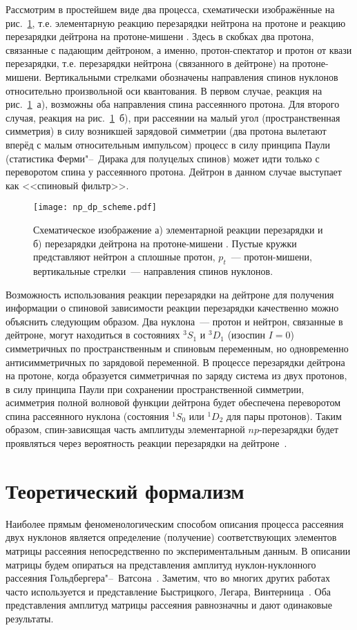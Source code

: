 Рассмотрим в простейшем виде два процесса, схематически изображённые на
рис.~\ref{fig:np_dp_scheme}, т.е. элементарную реакцию перезарядки нейтрона на
протоне \np и реакцию перезарядки дейтрона на протоне-мишени \dpchex. Здесь в
скобках два протона, связанные с падающим дейтроном, а именно,
протон-спектатор и протон от квази \np перезарядки, т.е. перезарядки
нейтрона (связанного в дейтроне) на протоне-мишени. Вертикальными стрелками
обозначены направления спинов нуклонов относительно произвольной оси
квантования. В первом случае, реакция \np на рис.~\ref{fig:np_dp_scheme}~а),
возможны оба направления спина рассеянного протона. Для второго случая, реакция
\dpchex на рис.~\ref{fig:np_dp_scheme}~б), при рассеянии на малый угол
(пространственная симметрия) в силу возникшей зарядовой симметрии (два протона
вылетают вперёд с малым относительным импульсом) процесс в силу принципа Паули
(статистика Ферми"--~Дирака для полуцелых спинов) может идти только с
переворотом спина у рассеянного протона. Дейтрон в данном случае выступает как
<<спиновый фильтр>>.

\begin{figure}[h]
  \centering
  \texttt{[image: np\_dp\_scheme.pdf]}
  \caption{Схематическое изображение а) элементарной реакции перезарядки \np
    и б) перезарядки дейтрона на протоне-мишени \dpchex. Пустые кружки
    представляют нейтрон а сплошные протон, $p_{t}$~--- протон-мишени,
    вертикальные стрелки~--- направления спинов нуклонов.}
  \label{fig:np_dp_scheme}
\end{figure}

Возможность использования реакции перезарядки на дейтроне для получения
информации о спиновой зависимости реакции перезарядки \np качественно можно
объяснить следующим образом. Два нуклона~--- протон и нейтрон, связанные в
дейтроне, могут находиться в состояниях $^3S_1$ и $^3D_1$ (изоспин $I=0$)
симметричных по пространственным и спиновым переменным, но одновременно
антисимметричных по зарядовой переменной. В процессе перезарядки дейтрона на
протоне, когда образуется симметричная по заряду система из двух протонов, в
силу принципа Паули при сохранении пространственной симметрии, асимметрия полной
волновой функции дейтрона будет обеспечена переворотом спина рассеянного нуклона
(состояния $^1S_0$ или $^1D_2$ для пары протонов). Таким образом, спин-зависящая
часть амплитуды элементарной $np$-перезарядки будет проявляться через
вероятность реакции перезарядки на дейтроне~\cite{gla_mucha00}.

\section{Теоретический формализм}
\label{section:theory}
Наиболее прямым феноменологическим способом описания процесса рассеяния двух
нуклонов является определение (получение) соответствующих элементов матрицы
рассеяния непосредственно по экспериментальным данным. В описании матрицы будем
опираться на представления амплитуд нуклон-нуклонного рассеяния
Гольдбергера"--~Ватсона~\cite{gold66}. Заметим, что во многих других работах
часто используется и представление Быстрицкого, Легара,
Винтерница~\cite{bys78_2}. Оба представления амплитуд матрицы рассеяния
равнозначны и дают одинаковые результаты.

